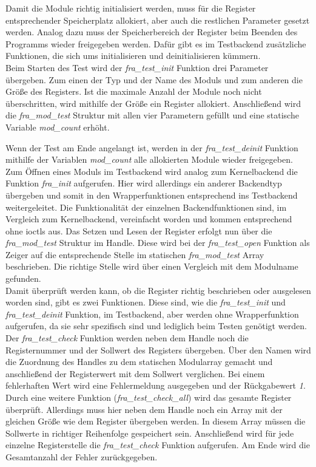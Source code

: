 Damit die Module richtig initialisiert werden, muss für die Register entsprechender Speicherplatz allokiert, aber auch die restlichen Parameter gesetzt werden. Analog dazu muss der Speicherbereich der Register beim Beenden des Programms wieder freigegeben werden. Dafür gibt es im Testbackend zusätzliche Funktionen, die sich ums initialisieren und deinitialisieren kümmern.\\

 
Beim Starten des Test wird der \textit{fra\_test\_init} Funktion drei Parameter übergeben. Zum einen der Typ und der Name des Moduls und zum anderen die Größe des Registers. Ist die maximale Anzahl der Module noch nicht überschritten, wird mithilfe der Größe ein Register allokiert. Anschließend wird die \textit{fra\_mod\_test} Struktur mit allen vier Parametern gefüllt und eine statische Variable \textit{mod\_count} erhöht.

Wenn der Test am Ende angelangt ist, werden in der \textit{fra\_test\_deinit} Funktion mithilfe der Variablen \textit{mod\_count} alle allokierten Module wieder freigegeben.\\


Zum Öffnen eines Moduls im Testbackend wird analog zum Kernelbackend die Funktion \textit{fra\_init} aufgerufen. Hier wird allerdings ein anderer Backendtyp übergeben und somit in den Wrapperfunktionen entsprechend ins Testbackend weitergeleitet. 
Die Funktionalität der einzelnen Backendfunktionen sind, im Vergleich zum Kernelbackend, vereinfacht worden und kommen entsprechend ohne \ac{ioctl}s aus. Das Setzen und Lesen der Register erfolgt nun über die \textit{fra\_mod\_test} Struktur im Handle. Diese wird bei der \textit{fra\_test\_open} Funktion als Zeiger auf die entsprechende Stelle im statischen \textit{fra\_mod\_test} Array beschrieben. Die richtige Stelle wird über einen Vergleich mit dem Modulname gefunden.\\



Damit überprüft werden kann, ob die Register richtig beschrieben oder ausgelesen worden sind, gibt es zwei Funktionen. Diese sind, wie die \textit{fra\_test\_init} und \textit{fra\_test\_deinit} Funktion, im Testbackend, aber werden ohne Wrapperfunktion aufgerufen, da sie sehr spezifisch sind und lediglich beim Testen genötigt werden.
Der \textit{fra\_test\_check} Funktion werden neben dem Handle noch die Registernummer und der Sollwert des Registers übergeben. Über den Namen wird die Zuordnung des Handles zu dem statischen Modularray gemacht und anschließend der Registerwert mit dem Sollwert verglichen. Bei einem fehlerhaften Wert wird eine Fehlermeldung ausgegeben und der Rückgabewert \textit{1}.
Durch eine weitere Funktion (\textit{fra\_test\_check\_all}) wird das gesamte Register überprüft. Allerdings muss hier neben dem Handle noch ein Array mit der gleichen Größe wie dem Register übergeben werden. In diesem Array müssen die Sollwerte in richtiger Reihenfolge gespeichert sein. Anschließend wird für jede einzelne Registerstelle die \textit{fra\_test\_check} Funktion aufgerufen. Am Ende wird die Gesamtanzahl der Fehler zurückgegeben.\\


